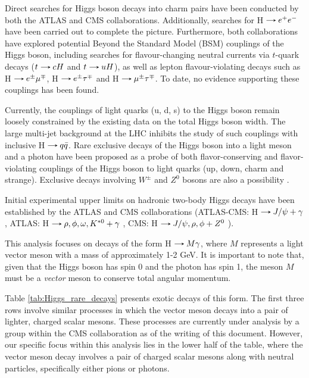 Direct searches for Higgs boson decays into charm pairs have been conducted by both the ATLAS and CMS collaborations. Additionally, searches for H$\decaysto e^+e^-$ have been carried out to complete the picture. Furthermore, both collaborations have explored potential Beyond the Standard Model (BSM) couplings of the Higgs boson, including searches for flavour-changing neutral currents via $t$-quark decays ($t\decaysto cH$ and $t\decaysto uH$), as well as lepton flavour-violating decays such as H$\decaysto e^\pm\mu^\mp$, H$\decaysto e^\pm\tau^\mp$ and H$\decaysto \mu^\pm\tau^\mp$. To date, no evidence supporting these couplings has been found.

Currently, the couplings of light quarks (u, d, s) to the Higgs boson remain loosely constrained by the existing data on the total Higgs boson width. The large multi-jet background at the LHC inhibits the study of such couplings with inclusive H$\decaysto q\bar{q}$. Rare exclusive decays of the Higgs boson into a light meson and a photon have been proposed as a probe of both flavor-conserving and flavor-violating couplings of the Higgs boson to light quarks (up, down, charm and strange). Exclusive decays involving $W^\pm$ and $Z^0$ bosons are also a possibility \cite{Kagan:2014ila}.

Initial experimental upper limits on hadronic two-body Higgs decays have been established by the ATLAS and CMS collaborations (ATLAS-CMS: H$\decaysto J/\psi + \gamma$ \cite{ATLAS:2022rej, CMS:2018gcm}, ATLAS: H$\decaysto \rho,\phi,\omega,K^{*0} + \gamma$ \cite{ATLAS:2017gko, ATLAS:2023alf}, CMS: H$\decaysto J/\psi,\rho,\phi + Z^0$ \cite{CMS:2022fsq, CMS:2020ggo}).

This analysis focuses on decays of the form H$\decaysto M\gamma$, where $M$ represents a light vector meson with a mass of approximately 1-2 GeV. It is important to note that, given that the Higgs boson has spin 0 and the photon has spin 1, the meson $M$ must be a \textit{vector} meson to conserve total angular momentum.

Table \ref{tab:Higgs_rare_decays} presents exotic decays of this form. The first three rows involve similar processes in which the vector meson decays into a pair of lighter, charged scalar mesons. These processes are currently under analysis by a group within the CMS collaboration as of the writing of this document. However, our specific focus within this analysis lies in the lower half of the table, where the vector meson decay involves a pair of charged scalar mesons along with neutral particles, specifically either pions or photons.

